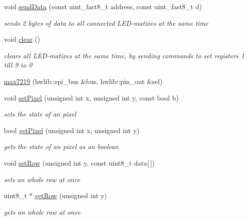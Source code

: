 \begin{DoxyCompactItemize}
\item 
void \mbox{\hyperlink{classmatrix_1_1max7219_a2b33d86987833e9f65cd1820b462187a}{send\+Data}} (const uint\+\_\+fast8\+\_\+t address, const uint\+\_\+fast8\+\_\+t d)
\begin{DoxyCompactList}\small\item\em sends 2 bytes of data to all connected L\+E\+D-\/matixes at the same time \end{DoxyCompactList}\item 
void \mbox{\hyperlink{classmatrix_1_1max7219_a15e123a5bdfa2df3cb6dedf99dd12162}{clear}} ()
\begin{DoxyCompactList}\small\item\em clears all L\+E\+D-\/matixes at the same time, by sending commands to set registers 1 till 9 to 0 \end{DoxyCompactList}\item 
\mbox{\hyperlink{classmatrix_1_1max7219_a7b922b6a730b7288d7e096e9c3c5b684}{max7219}} (hwlib\+::spi\+\_\+bus \&bus, hwlib\+::pin\+\_\+out \&sel)
\item 
void \mbox{\hyperlink{classmatrix_1_1max7219_a8a3586ab0833ffca836f072a55c69ae4}{set\+Pixel}} (unsigned int x, unsigned int y, const bool b)
\begin{DoxyCompactList}\small\item\em sets the state of an pixel \end{DoxyCompactList}\item 
bool \mbox{\hyperlink{classmatrix_1_1max7219_a3bd74301ca921fbafe39cb516901dca2}{get\+Pixel}} (unsigned int x, unsigned int y)
\begin{DoxyCompactList}\small\item\em gets the state of an pixel as an boolean \end{DoxyCompactList}\item 
void \mbox{\hyperlink{classmatrix_1_1max7219_a3aadc85e2d4fea939fbb8d9be9042983}{set\+Row}} (unsigned int y, const uint8\+\_\+t data\mbox{[}$\,$\mbox{]})
\begin{DoxyCompactList}\small\item\em sets an whole row at once \end{DoxyCompactList}\item 
uint8\+\_\+t $\ast$ \mbox{\hyperlink{classmatrix_1_1max7219_a48ff4d31e9bc3fd93be73406830e3d62}{get\+Row}} (unsigned int y)
\begin{DoxyCompactList}\small\item\em gets an whole row at once \end{DoxyCompactList}\end{DoxyCompactItemize}


